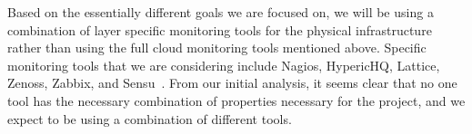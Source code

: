 Based on the essentially different goals we are focused on, we will be using a combination of layer specific monitoring tools for the physical infrastructure rather than using the full cloud monitoring tools mentioned above. Specific monitoring tools that we are considering include Nagios, HypericHQ, Lattice, Zenoss, Zabbix, and Sensu~\cite{sandoval2012evaluation,Aceto2013}. From our initial analysis, it seems clear that no one tool has the necessary combination of properties necessary for the project, and we expect to be using a combination of different tools.